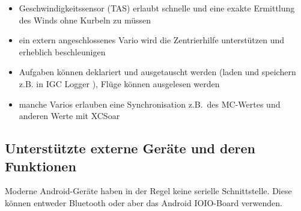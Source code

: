 \begin{itemize}
\item Geschwindigkeitssensor (TAS) erlaubt schnelle und eine exakte Ermittlung des Winds ohne Kurbeln zu müssen
\item ein extern angeschlossenes Vario wird die Zentrierhilfe unterstützen und erheblich beschleunigen
\item Aufgaben können deklariert und ausgetauscht werden (laden und speichern z.B. in IGC Logger ),   Flüge können ausgelesen werden 
\item manche Varios erlauben eine Synchronisation z.B.\ des MC-Wertes und anderen Werte mit {\textsf  XCSoar} 
\end{itemize}

\subsection*{Unterstützte externe Geräte und deren Funktionen}\label{sec:supported-varios}

\newcommand{\y}[0]{{ $\surd$ }}
\noindent{}


Moderne Android-Geräte haben in der Regel keine serielle Schnittstelle.
Diese können entweder Bluetooth oder aber das Android IOIO-Board verwenden. 


